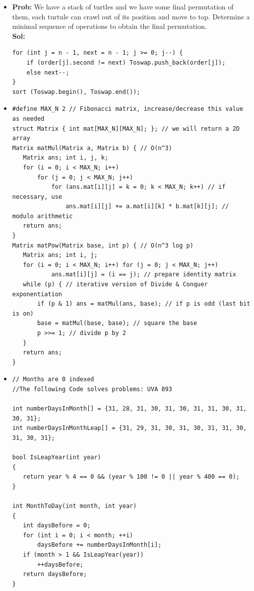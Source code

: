 \documentclass[8pt, a4paper, oneside, twocolumn]{extarticle}
\begin{document}
\begin{itemize}
\begin{verbatim}
    }
    if (rightmost < m) {
       cout << "0\n";
    }
}

    \end{verbatim}
    \item \textbf{Prob: }We have a stack of turtles and we have some final permutation of them, each turtule can crawl out of its position and move to top. Determine a minimal sequence of operations to obtain the final permutation.\\\textbf{Sol: }
    \begin{verbatim}
for (int j = n - 1, next = n - 1; j >= 0; j--) {
    if (order[j].second != next) Toswap.push_back(order[j]);
    else next--;
}
sort (Toswap.begin(), Toswap.end());
\end{verbatim}
    \item \begin{verbatim}
#define MAX_N 2 // Fibonacci matrix, increase/decrease this value as needed
struct Matrix { int mat[MAX_N][MAX_N]; }; // we will return a 2D array
Matrix matMul(Matrix a, Matrix b) { // O(n^3)
   Matrix ans; int i, j, k;
   for (i = 0; i < MAX_N; i++)
       for (j = 0; j < MAX_N; j++)
           for (ans.mat[i][j] = k = 0; k < MAX_N; k++) // if necessary, use
               ans.mat[i][j] += a.mat[i][k] * b.mat[k][j]; // modulo arithmetic
   return ans;
}
Matrix matPow(Matrix base, int p) { // O(n^3 log p)
   Matrix ans; int i, j;
   for (i = 0; i < MAX_N; i++) for (j = 0; j < MAX_N; j++)
           ans.mat[i][j] = (i == j); // prepare identity matrix
   while (p) { // iterative version of Divide & Conquer exponentiation
       if (p & 1) ans = matMul(ans, base); // if p is odd (last bit is on)
       base = matMul(base, base); // square the base
       p >>= 1; // divide p by 2
   }
   return ans;
}
    \end{verbatim}
    \item \begin{verbatim}
// Months are 0 indexed
//The following Code solves problems: UVA 893 

int numberDaysInMonth[] = {31, 28, 31, 30, 31, 30, 31, 31, 30, 31, 30, 31};
int numberDaysInMonthLeap[] = {31, 29, 31, 30, 31, 30, 31, 31, 30, 31, 30, 31};

bool IsLeapYear(int year)
{
   return year % 4 == 0 && (year % 100 != 0 || year % 400 == 0);
}

int MonthToDay(int month, int year)
{
   int daysBefore = 0;
   for (int i = 0; i < month; ++i)
       daysBefore += numberDaysInMonth[i];
   if (month > 1 && IsLeapYear(year))
       ++daysBefore;
   return daysBefore;
}


\end{verbatim}
\end{itemize}
\end{document}
